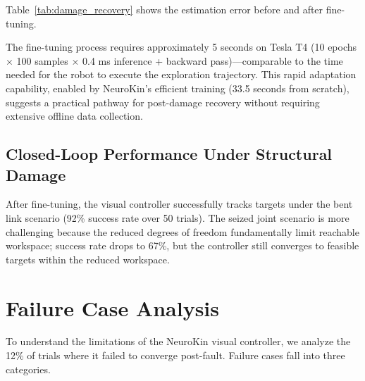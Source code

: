 ﻿\documentclass[12pt,a4paper,oneside]{report}
\begin{document}
Table~\ref{tab:damage_recovery} shows the estimation error before and after fine-tuning.

\begin{table}[H]
\centering
\caption{NeuroKin-3D estimation error under structural damage before and after fine-tuning.}
\label{tab:damage_recovery}
\end{table}

The fine-tuning process requires approximately 5 seconds on Tesla T4 (10 epochs $\times$ 100 samples $\times$ 0.4 ms inference + backward pass)---comparable to the time needed for the robot to execute the exploration trajectory. This rapid adaptation capability, enabled by NeuroKin's efficient training (33.5 seconds from scratch), suggests a practical pathway for post-damage recovery without requiring extensive offline data collection.

\subsection{Closed-Loop Performance Under Structural Damage}

After fine-tuning, the visual controller successfully tracks targets under the bent link scenario (92\% success rate over 50 trials). The seized joint scenario is more challenging because the reduced degrees of freedom fundamentally limit reachable workspace; success rate drops to 67\%, but the controller still converges to feasible targets within the reduced workspace.

\section{Failure Case Analysis}

To understand the limitations of the NeuroKin visual controller, we analyze the 12\% of trials where it failed to converge post-fault. Failure cases fall into three categories.
\end{document}
